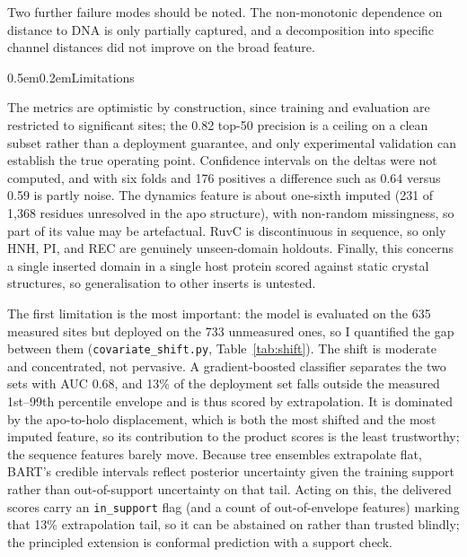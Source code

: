 \documentclass[10pt]{article}
\makeatletter
\renewcommand\section{\@startsection{section}{1}{0pt}%
  {0.5em}{0.2em}{\normalsize\bfseries}}
\makeatother
\begin{document}
Two further failure modes should be noted. The non-monotonic dependence on distance to DNA is only
partially captured, and a decomposition into specific channel distances did not improve on the
broad feature.

\section{Limitations}

The metrics are optimistic by construction, since training and evaluation are restricted to
significant sites; the 0.82 top-50 precision is a ceiling on a clean subset rather than a
deployment guarantee, and only experimental validation can establish the true operating point.
Confidence intervals on the deltas were not computed, and with six folds and 176 positives a
difference such as 0.64 versus 0.59 is partly noise. The dynamics feature is about one-sixth
imputed (231 of 1{,}368 residues unresolved in the apo structure), with non-random missingness,
so part of its value may be artefactual. RuvC is discontinuous in sequence, so only HNH, PI, and REC are genuinely
unseen-domain holdouts. Finally, this concerns a single inserted domain in a single host protein
scored against static crystal structures, so generalisation to other inserts is untested.

The first limitation is the most important: the model is evaluated on the 635 measured sites but
deployed on the 733 unmeasured ones, so I quantified the gap between them
(\texttt{covariate\_shift.py}, Table~\ref{tab:shift}). The shift is moderate and concentrated, not
pervasive. A gradient-boosted classifier separates the two sets with AUC 0.68, and 13\% of the
deployment set falls outside the measured 1st--99th percentile envelope and is thus scored by
extrapolation. It is dominated by the apo-to-holo displacement, which is both the most shifted and
the most imputed feature, so its contribution to the product scores is the least trustworthy; the
sequence features barely move. Because tree ensembles extrapolate flat, BART's credible intervals
reflect posterior uncertainty given the training support rather than out-of-support uncertainty on
that tail. Acting on this, the delivered scores carry an \texttt{in\_support} flag (and a count of
out-of-envelope features) marking that 13\% extrapolation tail, so it can be abstained on rather
than trusted blindly; the principled extension is conformal prediction with a support check.
\end{document}
